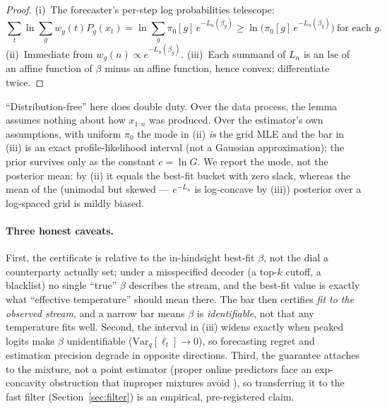 \documentclass[11pt]{article}
\begin{document}
\begin{proof}
(i)~The forecaster's per-step log probabilities telescope:
\[
  \textstyle\sum_t \ln \sum_g w_g(t) P_g(x_t)
  = \ln \sum_g \pi_0[g]\, e^{-L_n(\beta_g)}
  \ge \ln\big(\pi_0[g]\, e^{-L_n(\beta_g)}\big)\ \text{for each } g.
\]
(ii)~Immediate from $w_g(n) \propto e^{-L_n(\beta_g)}$.
(iii)~Each summand of $L_n$ is an $\mathrm{lse}$ of an affine function of $\beta$
minus an affine function, hence convex; differentiate twice.
\end{proof}

``Distribution-free'' here does double duty. Over the data process, the lemma
assumes nothing about how $x_{1:n}$ was produced. Over the estimator's own
assumptions, with uniform $\pi_0$ the mode in (ii) \emph{is} the grid MLE and the
bar in (iii) is an exact profile-likelihood interval (not a Gaussian
approximation); the prior survives only as the constant $c=\ln G$. We report the
mode, not the posterior mean: by (ii) it equals the best-fit bucket with zero
slack, whereas the mean of the (unimodal but skewed --- $e^{-L_n}$ is log-concave
by (iii)) posterior over a log-spaced grid is mildly biased.

\paragraph{Three honest caveats.}
First, the certificate is relative to the in-hindsight best-fit $\beta$, not the
dial a counterparty actually set; under a misspecified decoder (a top-$k$ cutoff,
a blacklist) no single ``true'' $\beta$ describes the stream, and the best-fit
value is exactly what ``effective temperature'' should mean there. The bar then
certifies \emph{fit to the observed stream}, and a narrow bar means $\beta$ is
\emph{identifiable}, not that any temperature fits well. Second, the interval in
(iii) widens exactly when peaked logits make $\beta$ unidentifiable
($\mathrm{Var}_{q}[\ell_t]\to 0$), so forecasting regret and estimation precision
degrade in opposite directions. Third, the guarantee attaches to the mixture, not
a point estimator (proper online predictors face an exp-concavity obstruction
that improper mixtures avoid \citep{foster2018logistic}), so transferring it to
the fast filter (Section~\ref{sec:filter}) is an empirical, pre-registered claim.
\end{document}
